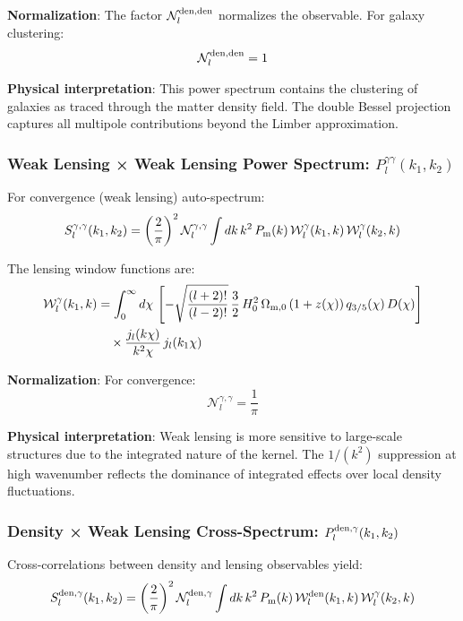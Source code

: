 \textbf{Normalization}: The factor $\mathcal{N}_l^{\rm den,den}$ normalizes the observable. For galaxy clustering:
\begin{equation}
\mathcal{N}_l^{\rm den,den} = 1
\end{equation}

\textbf{Physical interpretation}: This power spectrum contains the clustering of galaxies as traced through the matter density field. The double Bessel projection captures all multipole contributions beyond the Limber approximation.

\subsubsection{Weak Lensing × Weak Lensing Power Spectrum: $P^{\gamma \gamma}_l(k_1, k_2)$}

For convergence (weak lensing) auto-spectrum:
\begin{equation}
\label{eq:ps_gam_gam}
S_l^{\gamma, \gamma}(k_1, k_2) = \left(\frac{2}{\pi}\right)^2 \mathcal{N}_l^{\gamma,\gamma} \int dk \, k^2 \, P_{\rm m}(k) \, \mathcal{W}_l^\gamma(k_1, k) \, \mathcal{W}_l^\gamma(k_2, k)
\end{equation}

The lensing window functions are:
\begin{align}
\label{eq:window_gam_fb}
\mathcal{W}_l^\gamma(k_1, k) &= \int_0^\infty d\chi \, \left[-\sqrt{\frac{(l+2)!}{(l-2)!}} \, \frac{3}{2} \, H_0^2 \, \Omega_{{\rm m},0} \, (1+z(\chi)) \, q_{3/5}(\chi) \, D(\chi)\right] \\
&\quad \times \frac{j_l(k \chi)}{k^2 \chi} \, j_l(k_1 \chi)
\end{align}

\textbf{Normalization}: For convergence:
\begin{equation}
\mathcal{N}_l^{\gamma,\gamma} = \frac{1}{\pi}
\end{equation}

\textbf{Physical interpretation}: Weak lensing is more sensitive to large-scale structures due to the integrated nature of the kernel. The $1/(k^2)$ suppression at high wavenumber reflects the dominance of integrated effects over local density fluctuations.

\subsubsection{Density × Weak Lensing Cross-Spectrum: $P^{\rm den,\gamma}_l(k_1, k_2)$}

Cross-correlations between density and lensing observables yield:
\begin{equation}
\label{eq:ps_den_gam}
S_l^{\rm den,\gamma}(k_1, k_2) = \left(\frac{2}{\pi}\right)^2 \mathcal{N}_l^{\rm den,\gamma} \int dk \, k^2 \, P_{\rm m}(k) \, \mathcal{W}_l^{\rm den}(k_1, k) \, \mathcal{W}_l^\gamma(k_2, k)
\end{equation}

